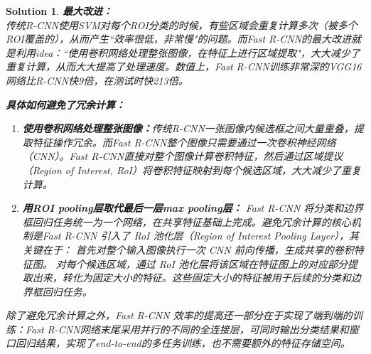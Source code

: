 \documentclass{article}
\theoremstyle{Problem}
\theoremstyle{Solution}
\newtheorem*{sol}{Solution}
\begin{document}
	\begin{sol}
	\textbf{最大改进：}\\
	传统R-CNN使用SVM对每个ROI分类的时候，有些区域会重复计算多次（被多个ROI覆盖的），从而产生``效率很低，非常慢"的问题。而Fast R-CNN的最大改进就是利用idea：``使用卷积网络处理整张图像，在特征上进行区域提取"，大大减少了重复计算，从而大大提高了处理速度。数值上，Fast R-CNN训练非常深的VGG16网络比R-CNN快9倍，在测试时快213倍。
	
	\textbf{具体如何避免了冗余计算：}
	\begin{enumerate}
		\item \textbf{使用卷积网络处理整张图像：}传统R-CNN一张图像内候选框之间大量重叠，提取特征操作冗余。而Fast R-CNN整个图像只需要通过一次卷积神经网络（CNN）。Fast R-CNN直接对整个图像计算卷积特征，然后通过区域提议（Region of Interest, RoI）将卷积特征映射到每个候选区域，大大减少了重复计算。
		\item \textbf{用ROI pooling层取代最后一层max pooling层： }Fast R-CNN 将分类和边界框回归任务统一为一个网络，在共享特征基础上完成。避免冗余计算的核心机制是Fast R-CNN 引入了 RoI 池化层（Region of Interest Pooling Layer），其关键在于：
		首先对整个输入图像执行一次 CNN 前向传播，生成共享的卷积特征图。
		对每个候选区域，通过 RoI 池化层将该区域在特征图上的对应部分提取出来，转化为固定大小的特征。这些固定大小的特征被用于后续的分类和边界框回归任务。
	\end{enumerate}
		
	除了避免冗余计算之外，Fast R-CNN 效率的提高还一部分在于实现了端到端的训练：Fast R-CNN网络末尾采用并行的不同的全连接层，可同时输出分类结果和窗口回归结果，实现了end-to-end的多任务训练，也不需要额外的特征存储空间。
	\end{sol}
\end{document}
